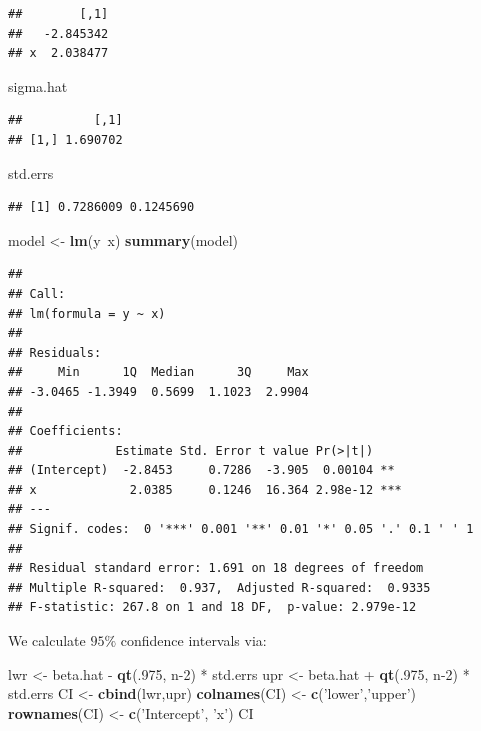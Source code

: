 \documentclass[]{book}
\newenvironment{Shaded}{\begin{snugshade}}{\end{snugshade}}
\newcommand{\KeywordTok}[1]{\textcolor[rgb]{0.13,0.29,0.53}{\textbf{{#1}}}}
\newcommand{\DecValTok}[1]{\textcolor[rgb]{0.00,0.00,0.81}{{#1}}}
\newcommand{\StringTok}[1]{\textcolor[rgb]{0.31,0.60,0.02}{{#1}}}
\newcommand{\NormalTok}[1]{{#1}}
\theoremstyle{definition}
\theoremstyle{definition}
\theoremstyle{remark}
\begin{document}
\begin{verbatim}
##        [,1]
##   -2.845342
## x  2.038477
\end{verbatim}

\begin{Shaded}
\begin{Highlighting}[]
\NormalTok{sigma.hat}
\end{Highlighting}
\end{Shaded}

\begin{verbatim}
##          [,1]
## [1,] 1.690702
\end{verbatim}

\begin{Shaded}
\begin{Highlighting}[]
\NormalTok{std.errs}
\end{Highlighting}
\end{Shaded}

\begin{verbatim}
## [1] 0.7286009 0.1245690
\end{verbatim}

\begin{Shaded}
\begin{Highlighting}[]
\NormalTok{model <-}\StringTok{ }\KeywordTok{lm}\NormalTok{(y~x)}
\KeywordTok{summary}\NormalTok{(model)}
\end{Highlighting}
\end{Shaded}

\begin{verbatim}
## 
## Call:
## lm(formula = y ~ x)
## 
## Residuals:
##     Min      1Q  Median      3Q     Max 
## -3.0465 -1.3949  0.5699  1.1023  2.9904 
## 
## Coefficients:
##             Estimate Std. Error t value Pr(>|t|)    
## (Intercept)  -2.8453     0.7286  -3.905  0.00104 ** 
## x             2.0385     0.1246  16.364 2.98e-12 ***
## ---
## Signif. codes:  0 '***' 0.001 '**' 0.01 '*' 0.05 '.' 0.1 ' ' 1
## 
## Residual standard error: 1.691 on 18 degrees of freedom
## Multiple R-squared:  0.937,  Adjusted R-squared:  0.9335 
## F-statistic: 267.8 on 1 and 18 DF,  p-value: 2.979e-12
\end{verbatim}

We calculate \(95\%\) confidence intervals via:

\begin{Shaded}
\begin{Highlighting}[]
\NormalTok{lwr <-}\StringTok{ }\NormalTok{beta.hat -}\StringTok{ }\KeywordTok{qt}\NormalTok{(.}\DecValTok{975}\NormalTok{, n}\DecValTok{-2}\NormalTok{) *}\StringTok{ }\NormalTok{std.errs}
\NormalTok{upr <-}\StringTok{ }\NormalTok{beta.hat +}\StringTok{ }\KeywordTok{qt}\NormalTok{(.}\DecValTok{975}\NormalTok{, n}\DecValTok{-2}\NormalTok{) *}\StringTok{ }\NormalTok{std.errs}
\NormalTok{CI <-}\StringTok{ }\KeywordTok{cbind}\NormalTok{(lwr,upr)}
\KeywordTok{colnames}\NormalTok{(CI) <-}\StringTok{ }\KeywordTok{c}\NormalTok{(}\StringTok{'lower'}\NormalTok{,}\StringTok{'upper'}\NormalTok{)}
\KeywordTok{rownames}\NormalTok{(CI) <-}\StringTok{ }\KeywordTok{c}\NormalTok{(}\StringTok{'Intercept'}\NormalTok{, }\StringTok{'x'}\NormalTok{)}
\NormalTok{CI}
\end{Highlighting}
\end{Shaded}
\end{document}
